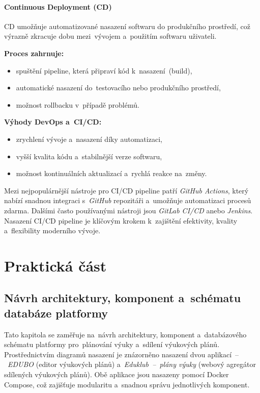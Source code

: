 \documentclass[male,czech,api_bc]{kitheses}
\begin{document}
\subsubsection{Continuous Deployment (CD)}

CD umožňuje automatizované nasazení softwaru do produkčního prostředí, což výrazně zkracuje dobu mezi~vývojem a~použitím softwaru uživateli.

\textbf{Proces zahrnuje:}
\begin{itemize}
	\item spuštění pipeline, která připraví kód k~nasazení~(build),
	\item automatické nasazení do~testovacího nebo produkčního prostředí,
	\item možnost rollbacku v~případě problémů.
\end{itemize}

\textbf{Výhody DevOps a~CI/CD:}
\begin{itemize}
	\item zrychlení vývoje a~nasazení díky automatizaci,
	\item vyšší kvalita kódu a~stabilnější verze softwaru,
	\item možnost kontinuálních aktualizací a~rychlá reakce na~změny.
\end{itemize}

Mezi nejpopulárnější nástroje pro CI/CD pipeline patří \textit{GitHub Actions}, který nabízí snadnou integraci s~\textit{GitHub} repozitáři a~umožňuje automatizaci procesů zdarma. Dalšími často používanými nástroji jsou \textit{GitLab CI/CD} anebo \textit{Jenkins}. Nasazení CI/CD pipeline je klíčovým krokem k~zajištění efektivity, kvality a~flexibility moderního vývoje.

\chapter{Praktická část}

\section{Návrh architektury, komponent a~schématu databáze platformy}

Tato kapitola se zaměřuje na~návrh architektury, komponent a~databázového schématu platformy pro~plánování výuky a~sdílení výukových plánů. Prostřednictvím diagramů nasazení je znázorněno nasazení dvou aplikací~--~\textit{EDUBO} (editor výukových plánů) a~\textit{Eduklub~--~plány výuky} (webový agregátor sdílených výukových plánů). Obě aplikace jsou nasazeny pomocí Docker Compose, což zajišťuje modularitu a~snadnou správu jednotlivých komponent.
\end{document}
